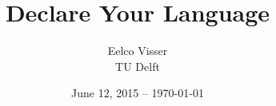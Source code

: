 \title{Declare Your Language}
	
\author{Eelco Visser\\[20pt]TU Delft}
	
\date{June 12, 2015 -- \today}
	



%



%
%
%



	

